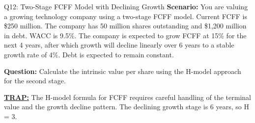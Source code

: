 \documentclass{beamer}
\renewcommand{\scriptsize}{\fontsize{6pt}{7pt}\selectfont}
\begin{document}
	\begin{frame}{Q12: Two-Stage FCFF Model with Declining Growth}
		\scriptsize
		\textbf{Scenario:} You are valuing a growing technology company using a two-stage FCFF model. Current FCFF is \$250 million. The company has 50 million shares outstanding and \$1,200 million in debt. WACC is 9.5\%. The company is expected to grow FCFF at 15\% for the next 4 years, after which growth will decline linearly over 6 years to a stable growth rate of 4\%. Debt is expected to remain constant.
		
		\textbf{Question:} Calculate the intrinsic value per share using the H-model approach for the second stage.
		
		\vspace{2pt}
		\underline{\textbf{TRAP:}} The H-model formula for FCFF requires careful handling of the terminal value and the growth decline pattern. The declining growth stage is 6 years, so H = 3.
	\end{frame}
	
\end{document}
